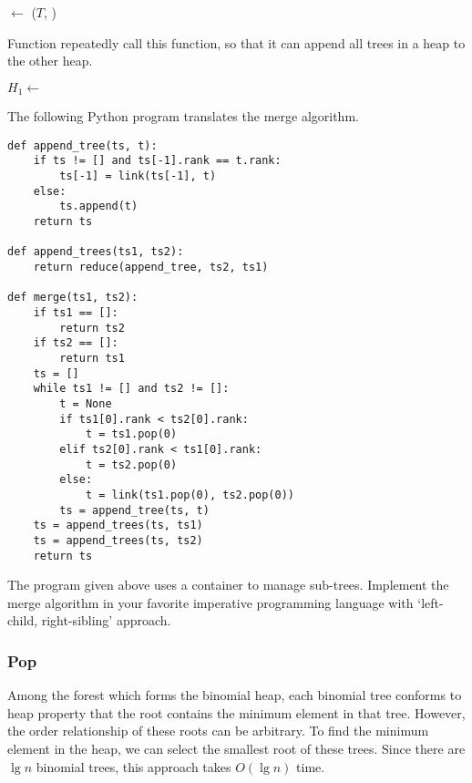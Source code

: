 \documentclass{article}
\begin{document}
\begin{algorithmic}[1]
    \State {} $\gets$ ($T$, )
  \Else
    \State {}
  \EndIf
\EndFunction
\end{algorithmic}

Function  repeatedly call this function, so
that it can append all trees in a heap to the other heap.

\begin{algorithmic}[1]
    \State $H_1 \gets $ 
  \EndFor
\EndFunction
\end{algorithmic}

The following Python program translates the merge algorithm.

\lstset{language=Python}
\begin{lstlisting}
def append_tree(ts, t):
    if ts != [] and ts[-1].rank == t.rank:
        ts[-1] = link(ts[-1], t)
    else:
        ts.append(t)
    return ts

def append_trees(ts1, ts2):
    return reduce(append_tree, ts2, ts1)

def merge(ts1, ts2):
    if ts1 == []:
        return ts2
    if ts2 == []:
        return ts1
    ts = []
    while ts1 != [] and ts2 != []:
        t = None
        if ts1[0].rank < ts2[0].rank:
            t = ts1.pop(0)
        elif ts2[0].rank < ts1[0].rank:
            t = ts2.pop(0)
        else:
            t = link(ts1.pop(0), ts2.pop(0))
        ts = append_tree(ts, t)
    ts = append_trees(ts, ts1)
    ts = append_trees(ts, ts2)
    return ts
\end{lstlisting}

\begin{Exercise}

The program given above uses a container to manage sub-trees.
Implement the merge algorithm in your favorite imperative programming
language with `left-child, right-sibling' approach.

\end{Exercise}

\subsubsection{Pop}
Among the forest which forms the binomial heap, each binomial tree
conforms to heap property that the root contains the minimum element
in that tree. However, the order relationship of these roots can be
arbitrary. To find the minimum element in the heap, we can select the
smallest root of these trees. Since there are $\lg n$ binomial trees,
this approach takes $O(\lg n)$ time.
\end{document}
